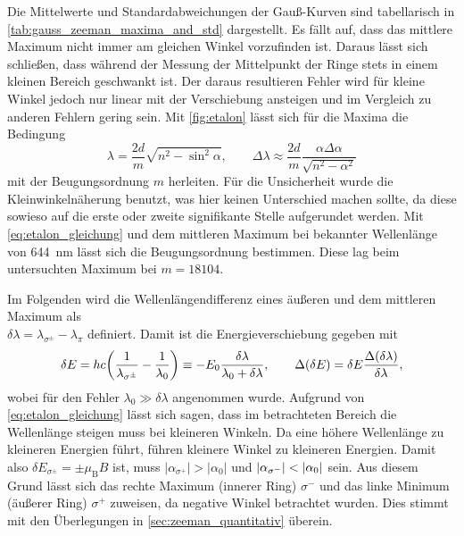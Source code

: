 Die Mittelwerte und Standardabweichungen der Gauß-Kurven sind tabellarisch in \cref{tab:gauss_zeeman_maxima_and_std}
dargestellt. Es fällt auf, dass das mittlere Maximum nicht immer am gleichen Winkel vorzufinden ist. Daraus lässt sich 
schließen, dass während der Messung der Mittelpunkt der Ringe stets in einem kleinen Bereich geschwankt 
ist. Der daraus resultieren Fehler wird für kleine Winkel 
jedoch nur linear mit der Verschiebung ansteigen und im Vergleich zu anderen Fehlern gering sein.
Mit \cref{fig:etalon} lässt sich für die Maxima die Bedingung 
\begin{equation}
    \lambda = \frac{2d}{m}\sqrt{n^2-\sin^2\alpha}, \qquad 
    \Delta\lambda \approx \frac{2d}{m}\frac{\alpha \Delta\alpha}{\sqrt{n^2 - \alpha^2}}
    \label{eq:etalon_gleichung}
\end{equation}
mit der Beugungsordnung $m$ herleiten. Für die Unsicherheit wurde die Kleinwinkelnäherung benutzt, was 
hier keinen Unterschied machen sollte, da diese sowieso auf die erste oder zweite signifikante Stelle
aufgerundet werden.
Mit \cref{eq:etalon_gleichung} und dem mittleren Maximum bei bekannter Wellenlänge von \SI{644}{\nm}
lässt sich die Beugungsordnung bestimmen. Diese lag beim untersuchten Maximum bei 
$m = \num{18104}$.



Im Folgenden wird die Wellenlängendifferenz eines äußeren und dem mittleren Maximum als 
\\$\delta\lambda = \lambda_{\sigma^\pm} - \lambda_\pi$ definiert. Damit ist die 
Energieverschiebung gegeben mit 
\begin{equation}
    \delta E = hc\qty(\frac{1}{\lambda_{\sigma^\pm}} - \frac{1}{\lambda_0})
        \equiv -E_0\frac{\delta\lambda}{\lambda_0+\delta\lambda}, \qquad
        \Delta(\delta E) = \delta E \frac{\Delta(\delta\lambda)}{\delta\lambda},
        \label{eq:energieverschiebung}
\end{equation}
wobei für den Fehler $\lambda_0\gg\delta\lambda$ angenommen wurde.
Aufgrund von \cref{eq:etalon_gleichung} lässt sich sagen, dass im betrachteten Bereich 
die Wellenlänge steigen muss bei kleineren Winkeln. Da eine höhere Wellenlänge zu kleineren 
Energien führt, führen kleinere Winkel zu kleineren Energien. Damit also 
$\delta E_{\sigma^\pm} = \pm \mu_\mathrm B B$ ist, muss $|\alpha_{\sigma^+}| > |\alpha_0|$
und $\abs{\alpha_{\sigma^-}} < \abs{\alpha_0}$ sein. Aus diesem Grund 
lässt sich das rechte Maximum (innerer Ring) $\sigma^-$ und das linke Minimum 
(äußerer Ring) $\sigma^+$ zuweisen, da negative Winkel betrachtet wurden. Dies stimmt mit 
den Überlegungen in \cref{sec:zeeman_quantitativ} überein.

